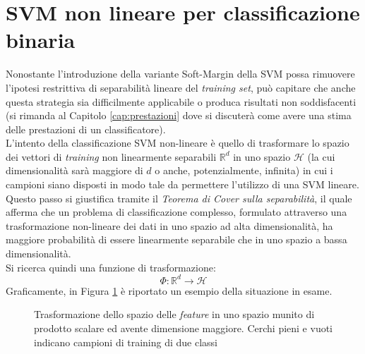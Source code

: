 \section{SVM non lineare per classificazione binaria}
Nonostante l'introduzione della variante Soft-Margin della SVM possa rimuovere l'ipotesi restrittiva di separabilità lineare del \emph{training set}, può capitare che anche questa strategia sia difficilmente applicabile o produca risultati non soddisfacenti (si rimanda al Capitolo \ref{cap:prestazioni} dove si discuterà come avere una stima delle prestazioni di un classificatore).
\\

L'intento della classificazione SVM non-lineare è quello di trasformare lo spazio dei vettori di \emph{training} non linearmente separabili $\mathbb{R}^d$ in uno spazio $\mathcal{H}$ (la cui dimensionalità sarà maggiore di $d$ o anche, potenzialmente, infinita) in cui i campioni siano disposti in modo tale da permettere l'utilizzo di una SVM lineare. Questo passo si giustifica tramite il \emph{Teorema di Cover sulla separabilità}, il quale afferma che un problema di classificazione complesso, formulato attraverso una trasformazione non-lineare dei dati in uno spazio ad alta dimensionalità, ha maggiore probabilità di essere linearmente separabile che in uno spazio a bassa dimensionalità.
\\
Si ricerca quindi una funzione di trasformazione:
\begin{equation}
\label{eq:funzione_di_trasformazione}
\Phi:\mathbb{R}^d\rightarrow\mathcal{H}
\end{equation}
Graficamente, in Figura \ref{fig:funzione_di_trasformazione} è riportato un esempio della situazione in esame.
 \begin{figure}[!ht]
    \caption{Trasformazione dello spazio delle \emph{feature} in uno spazio munito di prodotto scalare ed avente dimensione maggiore. Cerchi pieni e vuoti indicano campioni di training di due classi}
    \label{fig:funzione_di_trasformazione}
  \end{figure}
